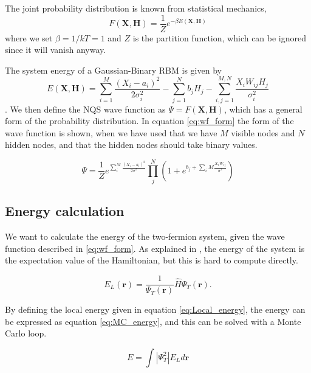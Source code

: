 \documentclass[norsk,a4paper,12pt]{article}
\begin{document}
The joint probability distribution is known from statistical mechanics,
\begin{equation}
\label{eq:F_rbm}
F(\boldsymbol{X},\boldsymbol{H})=\frac{1}{Z}e^{-\beta E(\boldsymbol{X},\boldsymbol{H})}
\end{equation}
where we set $\beta=1/kT=1$ and $Z$ is the partition function, which can be ignored since it will vanish anyway. 

The system energy of a Gaussian-Binary RBM is given by
\begin{equation}
E(\boldsymbol{X},\boldsymbol{H})=\sum_{i=1}^{M}\frac{(X_i-a_i)^2}{2\sigma_i^2}-\sum_{j=1}^Nb_jH_j-\sum_{i,j=1}^{M,N}\frac{X_iW_{ij}H_j}{\sigma_i^2}
\end{equation}
\cite{Hinton}. We then define the NQS wave function as $\Psi = F(\boldsymbol{X},\boldsymbol{H})$, which has a general form of the probability distribution. In equation \ref{eq:wf_form} the form of the wave function is shown, when we have used that we have $M$ visible nodes and $N$ hidden nodes, and that the hidden nodes should take binary values. 

\begin{equation}
\label{eq:wf_form}
	\Psi = \frac{1}{Z} e^{\sum_i^M \frac{(X_i - a_i)^2}{2\sigma^2}} \prod_j^N (1+ e^{b_j + \sum_iM \frac{X_i W_{ij}}{\sigma^2}})
\end{equation}

\subsection{Energy calculation} \label{sec:RBM_energy_cal}
We want to calculate the energy of the two-fermion system, given the wave function described in \ref{eq:wf_form}. As explained in \cite{Nordhagen}, the energy of the system is the expectation value of the Hamiltonian, but this is hard to compute directly. 

\begin{equation}
E_L(\boldsymbol{r})=\frac{1}{\Psi_T(\boldsymbol{r})}\hat{H}\Psi_T(\boldsymbol{r}).
\label{eq:Local_energy}
\end{equation}

By defining the local energy given in equation \ref{eq:Local_energy}, the energy can be expressed as equation \ref{eq:MC_energy}, and this can be solved with a Monte Carlo loop.

\begin{equation}
\label{eq:MC_energy}
E = \int | \Psi_T^2| E_L d\boldsymbol{r}
\end{equation}
\end{document}
